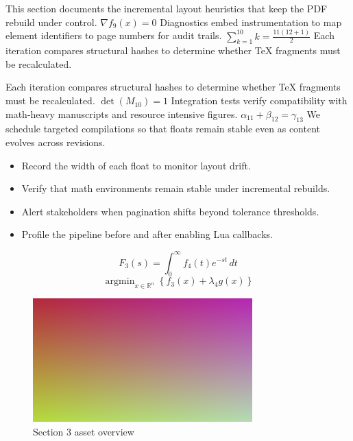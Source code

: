     This section documents the incremental layout heuristics that keep the PDF rebuild under control.  $\nabla f_{9}(x) = 0$  Diagnostics embed instrumentation to map element identifiers to page numbers for audit trails.  $\sum_{k=1}^{10} k = \frac{11(12+1)}{2}$  Each iteration compares structural hashes to determine whether TeX fragments must be recalculated.
    \par
  
    Each iteration compares structural hashes to determine whether TeX fragments must be recalculated.  $\det(M_{10}) = 1$  Integration tests verify compatibility with math-heavy manuscripts and resource intensive figures.  $\alpha_{11} + \beta_{12} = \gamma_{13}$  We schedule targeted compilations so that floats remain stable even as content evolves across revisions.
    \par
  
    \begin{itemize}
      
    \item Record the width of each float to monitor layout drift.
    \item Verify that math environments remain stable under incremental rebuilds.
    \item Alert stakeholders when pagination shifts beyond tolerance thresholds.
    \item Profile the pipeline before and after enabling Lua callbacks.
    \end{itemize}
\begin{equation}
\label{eq:sec3-eq1}
F_{3}(s) = \int_{0}^{\infty} f_{4}(t) e^{-st} \, dt
\end{equation}
\[
\operatorname{argmin}_{x \in \mathbb{R}^{n}} \left\{ f_{3}(x) + \lambda_{4} g(x) \right\}
\]

    \begin{figure}[htbp]
      \centering
      
          \includegraphics[width=0.82\linewidth]{../assets/images/placeholder2.png}
        
        \caption{Section 3 asset overview}
      
        \label{fig:fig-sec3}
      
    \end{figure}
  
